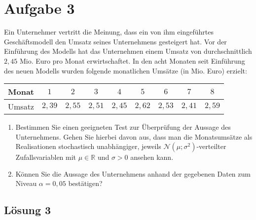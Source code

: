 \documentclass[main.tex]{subfiles}
\begin{document}
\section{Aufgabe 3}
Ein Unternehmer vertritt die Meinung, dass ein von ihm eingeführtes Geschäftsmodell den Umsatz seines Unternehmens gesteigert hat. Vor der Einführung des Modells hat das Unternehmen einem Umsatz von durchschnittlich $2,45$ Mio. Euro pro Monat erwirtschaftet. In den acht Monaten seit Einführung des neuen Modells wurden folgende monatlichen Umsätze (in Mio. Euro) erzielt:
\begin{center}
	\begin{tabular}{|l|c|c|c|c|c|c|c|c|} \hline
		Monat  &    $1$ &    $2$ &    $3$ &    $4$ &    $5$ &    $6$ &    $7$ &    $8$ \\ \hline
		Umsatz & $2,39$ & $2,55$ & $2,51$ & $2,45$ & $2,62$ & $2,53$ & $2,41$ & $2,59$ \\ \hline	
	\end{tabular}
\end{center}
\begin{enumerate}
\item Bestimmen Sie einen geeigneten Test zur Überprüfung der Aussage des Unternehmens. Gehen Sie hierbei davon aus, dass man die Monatsumsätze als Realisationen stochastisch unabhängiger, jeweils $\mathcal{N}(\mu; \sigma^2)$-verteilter Zufallsvariablen mit $\mu \in \mathbb{R}$ und $\sigma > 0$ ansehen kann.
\item Können Sie die Aussage des Unternehmens anhand der gegebenen Daten zum Niveau $\alpha = 0,05$ bestätigen?
\end{enumerate}

\subsection{Lösung 3}
\end{document}
